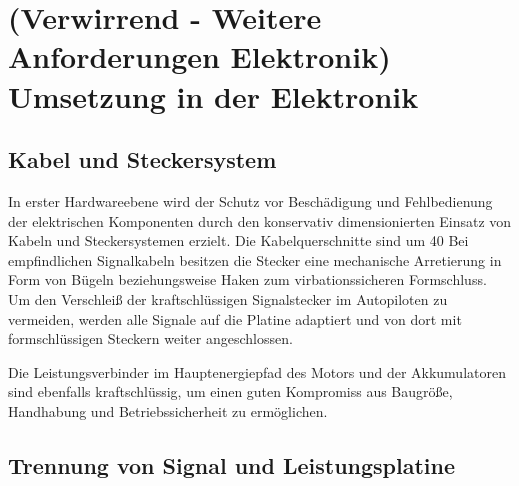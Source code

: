 \section{(Verwirrend - Weitere Anforderungen Elektronik) Umsetzung in der Elektronik}

\subsection{Kabel und Steckersystem}

In erster Hardwareebene  wird der Schutz vor Beschädigung und Fehlbedienung der elektrischen Komponenten durch den konservativ dimensionierten Einsatz von Kabeln und Steckersystemen erzielt. Die Kabelquerschnitte sind um 40 %
Bei empfindlichen Signalkabeln besitzen die Stecker eine mechanische Arretierung  in Form von Bügeln beziehungsweise Haken zum virbationssicheren Formschluss.
Um den Verschleiß der kraftschlüssigen Signalstecker im Autopiloten zu vermeiden, werden alle Signale auf die Platine adaptiert und von dort mit formschlüssigen  Steckern weiter angeschlossen.

Die Leistungsverbinder im Hauptenergiepfad des Motors und der Akkumulatoren sind ebenfalls kraftschlüssig, um einen guten Kompromiss aus Baugröße, Handhabung und Betriebssicherheit zu ermöglichen.


\begin{comment}
In erster Hardwareebene  wird der Schutz vor Beschädigung und Fehlbedienung der elektrischen Komponenten durch konservativ dimensionierten Einsatz von Kabeln und Steckersystemen erzielt. Die Kabelquerschnitte sind um [Prozentzahl ?]
überdimensioniert. Bei den Steckverbindungen wird nach Möglichkeit eine einmalige Polanzahl des Verbinders gewählt.
Die Stecker besitzen bei empfindlichen Signalkabeln eine mechanische Arretierung durch virbationssicheren Formschluss in Form von Bügeln beziehungsweise Haken.
Um den Verschleiß der kraftschluss basierten Signalstecker im Autopiloten zu vermeiden, werden alle Signale auf die Platine adaptiert und von dort mit formschluss basierten Steckern weiter angeschlossen.

Die Leistungsverbinder im Hauptenergiepfad des Motors und der der Akkumulatoren sind kraftschlussbasiert, um einen Kompromiss aus Baugröße, Handhabung und Bertriebssicherheit zu erzielen.
\end{comment}


\subsection{Trennung von Signal und Leistungsplatine}

